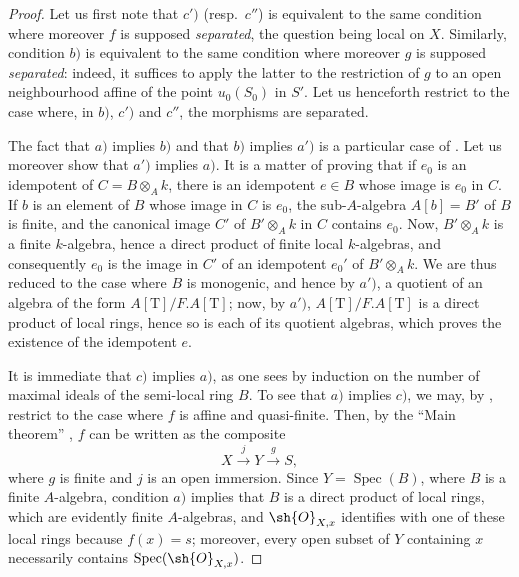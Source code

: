 \begin{proof}
Let us first note that $c')$ (resp.\ $c''$) is equivalent to the same condition where moreover $f$ is supposed \emph{separated}, the question being local on $X$.
Similarly, condition $b)$ is equivalent to the same condition where moreover $g$ is supposed \emph{separated}:
indeed, it suffices to apply the latter to the restriction of $g$ to an open neighbourhood affine of the point $u_0(S_0)$ in $S'$.
Let us henceforth restrict to the case where, in $b)$, $c')$ and $c''$, the morphisms are separated.

The fact that $a)$ implies $b)$ and that $b)$ implies $a')$ is a particular case of .
Let us moreover show that $a')$ implies $a)$.
It is a matter of proving that if $e_0$ is an idempotent of $C=B\otimes_A k$, there is an idempotent $e\in B$ whose image is $e_0$ in $C$.
If $b$ is an element of $B$ whose image in $C$ is $e_0$, the sub-$A$-algebra $A[b]=B'$ of $B$ is finite, and the canonical image $C'$ of $B'\otimes_A k$ in $C$ contains $e_0$.
Now, $B'\otimes_A k$ is a finite $k$-algebra, hence a direct product of finite local $k$-algebras, and consequently $e_0$ is the image in $C'$ of an idempotent $e_0'$ of $B'\otimes_A k$.
We are thus reduced to the case where $B$ is monogenic, and hence by $a')$, a quotient of an algebra of the form $A[\mathrm{T}]/F.A[\mathrm{T}]$;
now, by $a')$, $A[\mathrm{T}]/F.A[\mathrm{T}]$ is a direct product of local rings, hence so is each of its quotient algebras, which proves the existence of the idempotent $e$.

It is immediate that $c)$ implies $a)$, as one sees by induction on the number of maximal ideals of the semi-local ring $B$.
To see that $a)$ implies $c)$, we may, by , restrict to the case where $f$ is affine and quasi-finite.
Then, by the ``Main theorem'' , $f$ can be written as the composite
\[
X\xrightarrow{j}Y\xrightarrow{g}S,
\]
where $g$ is finite and $j$ is an open immersion.
Since $Y=\operatorname{Spec}(B)$, where $B$ is a finite $A$-algebra, condition $a)$ implies that $B$ is a direct product of local rings, which are evidently finite $A$-algebras, and $\sh{O}_{X,x}$ identifies with one of these local rings because $f(x)=s$;
moreover, every open subset of $Y$ containing $x$ necessarily contains $\operatorname{Spec}(\sh{O}_{X,x})$.


\end{proof}
